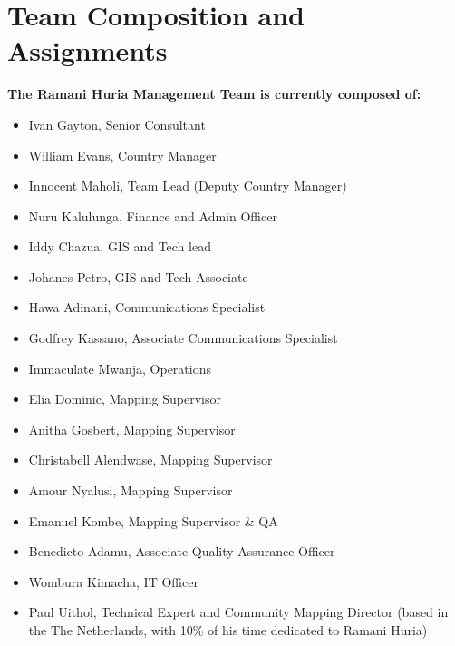 \documentclass[a4paper,12pt,twoside]{article}
\begin{document}
\newpage
\section{Team Composition and Assignments}

\textbf{The Ramani Huria Management Team is currently composed of:}

\begin{itemize}
     
 \item Ivan Gayton, Senior Consultant
 \item William Evans, Country Manager
 \item Innocent Maholi, Team Lead (Deputy Country Manager)
 \item Nuru Kalulunga, Finance and Admin Officer
 \item Iddy Chazua, GIS and Tech lead
 \item Johanes Petro, GIS and Tech Associate
 \item Hawa Adinani, Communications Specialist
 \item Godfrey Kassano, Associate Communications Specialist
 \item Immaculate Mwanja, Operations
 \item Elia Dominic, Mapping Supervisor
 \item Anitha Gosbert, Mapping Supervisor
 \item Christabell Alendwase, Mapping Supervisor
 \item Amour Nyalusi, Mapping Supervisor
 \item Emanuel Kombe, Mapping Supervisor \& QA
 \item Benedicto Adamu, Associate Quality Assurance Officer
 \item Wombura Kimacha, IT Officer
 \item Paul Uithol, Technical Expert and Community Mapping Director (based in the
The Netherlands, with 10\% of his time dedicated to Ramani Huria)
\end{itemize}

\newpage
\end{document}
